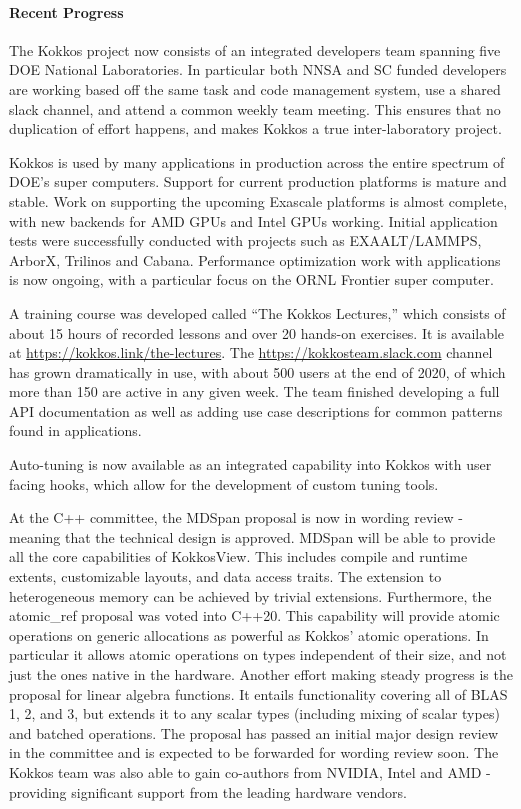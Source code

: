 \paragraph{Recent Progress}

The Kokkos project now consists of an integrated developers team spanning five DOE National Laboratories.
In particular both NNSA and SC funded developers are working based off the same task and code management system, use a shared slack channel, and attend a common weekly team meeting.
This ensures that no duplication of effort happens, and makes Kokkos a true inter-laboratory project.

Kokkos is used by many applications in production across the entire spectrum of DOE's super computers.
Support for current production platforms is mature and stable.
Work on supporting the upcoming Exascale platforms is almost complete, with new backends for AMD GPUs and Intel GPUs working. 
Initial application tests were successfully conducted with projects such as EXAALT/LAMMPS, ArborX, Trilinos and Cabana.
Performance optimization work with applications is now ongoing, with a particular focus on the ORNL Frontier super computer.

A training course was developed called ``The Kokkos Lectures,'' which consists of about 15 hours of recorded lessons and over 20 hands-on exercises.
It is available at \url{https://kokkos.link/the-lectures}.
The \url{https://kokkosteam.slack.com} channel has grown dramatically in use, with about 500 users at the end of 2020, of which more than 150 are active in any given week.
The team finished developing a full API documentation as well as adding use case descriptions for common patterns found in applications.

Auto-tuning is now available as an integrated capability into Kokkos with user facing hooks, which allow for the development of custom tuning tools.

At the C++ committee, the MDSpan proposal is now in wording review - meaning that the technical design is approved. 
MDSpan will be able to provide all the core capabilities of Kokkos\:\:View.
This includes compile and runtime extents, customizable layouts, and data access traits.
The extension to heterogeneous memory can be achieved by trivial extensions.
Furthermore, the atomic\_ref proposal was voted into C++20.
This capability will provide atomic operations on generic allocations as powerful as Kokkos' atomic operations.
In particular it allows atomic operations on types independent of their size, and not just the ones native in the hardware.
Another effort making steady progress is the proposal for linear algebra functions.
It entails functionality covering all of BLAS 1, 2, and 3, but extends it to any scalar types (including mixing of scalar types) and batched operations.
The proposal has passed an initial major design review in the committee and is expected to be forwarded for wording review soon.
The Kokkos team was also able to gain co-authors from NVIDIA, Intel and AMD - providing significant support from the leading hardware vendors.

